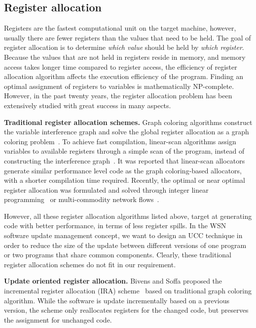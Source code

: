 \subsection{Register allocation}

Registers are the fastest computational unit on the target machine, however, usually there are fewer registers than the values that need to be held. The goal of register allocation is to determine {\it which value} should be held by {\it which register}. Because the values that are not held in registers reside in memory, and memory access takes longer time compared to register access, the efficiency of register allocation algorithm affects the execution efficiency of the program. 
Finding an optimal assignment of registers to variables is mathematically NP-complete. However, in the past twenty years, the register allocation problem has been extensively studied with great success in many aspects. 

\textbf{Traditional register allocation schemes.} 
Graph coloring algorithms construct the variable interference graph and solve the global register allocation as a graph coloring problem~\cite{related:graph-color,related:graph-color-improvements,related:graph-color-iterated,related:graph-color-priority}. To achieve fast compilation, linear-scan algorithms assign variables to available registers through a simple scan of the program, instead of constructing the interference graph~\cite{related:linear-scan,related:linear-scan-fast}. It was reported that linear-scan allocators generate similar performance level code as the graph coloring-based allocators, with a shorter compilation time required. Recently, the optimal or near optimal register allocation was formulated and solved through integer linear programming~\cite{related:ilp,related:ilp-cisc,related:ilp-fast} or multi-commodity network flows~\cite{related:ilp-progressive}.

However, all these register allocation algorithms listed above, target at generating code with better performance, in terms of less register spills. In the WSN software update management concept, we want to design an UCC technique in order to reduce the size of the update between different versions of one program or two programs that share common components. Clearly, these traditional register allocation schemes do not fit in our requirement.

\textbf{Update oriented register allocation.}
Bivens and Soffa proposed the incremental register allocation (IRA) scheme~\cite{related:ira} based on traditional graph coloring algorithm. While the software is update incrementally based on a previous version, the scheme only reallocates registers for the changed code, but preserves the assignment for unchanged code. 

